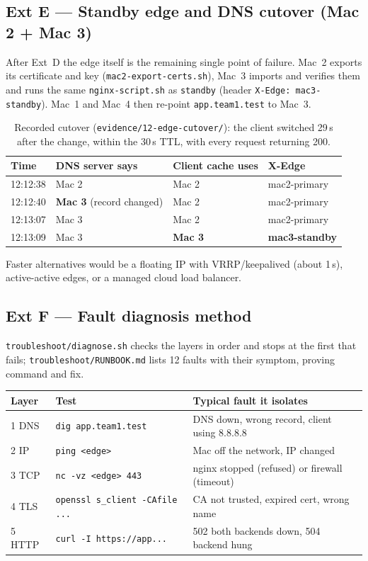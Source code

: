\documentclass[11pt,a4paper]{article}
\newcommand{\cmd}[1]{\texttt{#1}}
\begin{document}
\subsection{Ext E --- Standby edge and DNS cutover (Mac 2 + Mac 3)}
After Ext~D the edge itself is the remaining single point of failure. Mac~2
exports its certificate and key (\cmd{mac2-export-certs.sh}), Mac~3 imports
and verifies them and runs the same \cmd{nginx-script.sh} as
\cmd{standby} (header \cmd{X-Edge: mac3-standby}). Mac~1 and Mac~4 then
re-point \cmd{app.team1.test} to Mac~3.

\begin{table}[h]
\centering
\begin{tabular}{l l l l}
\toprule
\textbf{Time} & \textbf{DNS server says} & \textbf{Client cache uses} & \textbf{X-Edge} \\
\midrule
12:12:38 & Mac 2 & Mac 2 & mac2-primary \\
12:12:40 & \textbf{Mac 3} (record changed) & Mac 2 & mac2-primary \\
12:13:07 & Mac 3 & Mac 2 & mac2-primary \\
12:13:09 & Mac 3 & \textbf{Mac 3} & \textbf{mac3-standby} \\
\bottomrule
\end{tabular}
\caption{Recorded cutover (\cmd{evidence/12-edge-cutover/}): the client switched 29\,s after the change, within the 30\,s TTL, with every request returning 200.}
\end{table}
\noindent Faster alternatives would be a floating IP with VRRP/keepalived
(about 1\,s), active-active edges, or a managed cloud load balancer.

\subsection{Ext F --- Fault diagnosis method}
\cmd{troubleshoot/diagnose.sh} checks the layers in order and stops at the
first that fails; \cmd{troubleshoot/RUNBOOK.md} lists 12 faults with their
symptom, proving command and fix.

\begin{table}[h]
\centering
\begin{tabularx}{\textwidth}{l l X}
\toprule
\textbf{Layer} & \textbf{Test} & \textbf{Typical fault it isolates} \\
\midrule
1 DNS & \cmd{dig app.team1.test} & DNS down, wrong record, client using 8.8.8.8 \\
2 IP & \cmd{ping <edge>} & Mac off the network, IP changed \\
3 TCP & \cmd{nc -vz <edge> 443} & nginx stopped (refused) or firewall (timeout) \\
4 TLS & \cmd{openssl s\_client -CAfile ...} & CA not trusted, expired cert, wrong name \\
5 HTTP & \cmd{curl -I https://app...} & 502 both backends down, 504 backend hung \\
\bottomrule
\end{tabularx}
\end{table}
\end{document}
